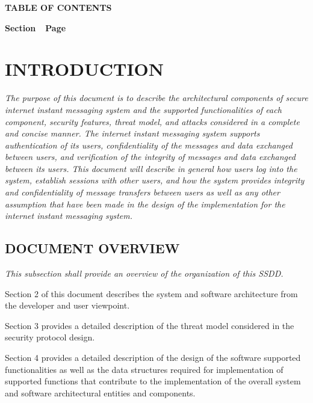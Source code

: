 \documentclass[twoside,letterpaper]{article}
\begin{document}
{\centering{}\bfseries\color{black}
TABLE OF CONTENTS
\par}

{\bfseries\color{black}
Section\ \ Page}

\setcounter{tocdepth}{9}
\renewcommand\contentsname{}
\tableofcontents

\bigskip

\bigskip
\clearpage\setcounter{page}{1}\pagestyle{Convertiv}
\section[INTRODUCTION]{\bfseries\color{black}
INTRODUCTION}
{\itshape\color{black}
The purpose of this document is to describe the architectural components of secure internet instant 
messaging system and the supported functionalities of each component, security features, 
threat model, and attacks considered in a complete and concise manner. 
The internet instant messaging system supports authentication of its users, 
confidentiality of the messages and data exchanged between users, and 
verification of the integrity of messages and data exchanged between its users. 
This document will describe in general how users log into the system, establish
 sessions with other users, and how the system provides integrity and confidentiality 
 of message transfers between users as well as any other assumption that 
 have been made in the design of the implementation for the internet instant 
 messaging system. \ }

\bigskip

\subsection{DOCUMENT OVERVIEW}
{\itshape\color{black}
This subsection shall provide an overview of the organization of this
SSDD.}

{\color{black}
Section 2 of this document describes the system and software
architecture from the developer and user viewpoint. \ }

{\color{black}
Section 3 provides a detailed description of the threat model considered 
in the security protocol design. \ }

{\color{black}
Section 4 provides a detailed description of the design of the software supported
functionalities as well as the data structures required for implementation
of supported functions that contribute to the implementation of the overall
system and software architectural entities and components.  \ }
\end{document}
